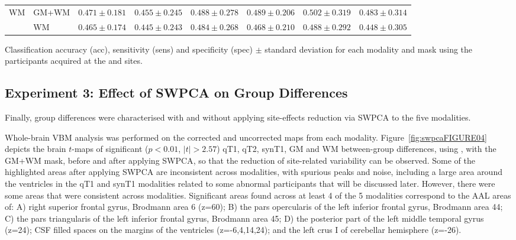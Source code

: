 \begin{bigtable}
\begin{tabularx}{\linewidth}{ll|XXX|XXX}
		\midrule
		\multirow{2}{*}{\ac{WM}} &GM+WM &		$ 0.471 \pm 0.181 $ & $ 0.455 \pm 0.245 $ & $ 0.488 \pm 0.278 $ & $ 0.489 \pm 0.206 $ & $ 0.502 \pm 0.319 $ &  $ 0.483 \pm 0.314 $ \\
		&		WM &		$ 0.465 \pm 0.174 $ & $ 0.445 \pm 0.243 $ & $ 0.484 \pm 0.268 $ & $ 0.468 \pm 0.210 $ & $ 0.488 \pm 0.292 $ &  $ 0.448 \pm 0.305 $ \\
		\bottomrule
	\end{tabularx}
	\caption[Classification accuracy (acc), sensitivity (sens) and specificity (spec) $\pm$ standard deviation for each modality and mask using the participants acquired at the \lon{} and \cam{} sites.]{Classification accuracy (acc), sensitivity (sens) and specificity (spec) $\pm$ standard deviation for each modality and mask using the participants acquired at the \lon{} and \cam{} sites.}
	\label{tab:swpcaLONCAM}
\end{bigtable}



\subsection{Experiment 3: Effect of \acs{SWPCA} on Group Differences}\label{sec:swpcaE3}
Finally, group differences were characterised with and without applying site-effects reduction via \ac{SWPCA} to the five modalities. 

Whole-brain \ac{VBM} analysis was performed on the corrected and uncorrected maps from each modality. Figure~\ref{fig:swpcaFIGURE04} depicts the brain $t$-maps of significant ($p<0.01$, $|t|>2.57$) \ac{qT1}, \ac{qT2}, \ac{synT1}, \ac{GM} and \ac{WM} between-group differences, using \all{}, with the GM+WM mask, before and after applying \ac{SWPCA}, so that the reduction of site-related variability can be observed. Some of the highlighted areas after applying \ac{SWPCA} are inconsistent across modalities, with spurious peaks and noise, including a large area around the ventricles in the \ac{qT1} and \ac{synT1} modalities related to some abnormal participants that will be discussed later. However, there were some areas that were consistent across modalities. Significant areas found across at least 4 of the 5 modalities correspond to the \ac{AAL} \cite{Tzourio-Mazoyer2002} areas of: A) right superior frontal gyrus, Brodmann area 6 (z=60); B) the pars opercularis of the left inferior frontal gyrus, Brodmann area 44; C) the pars triangularis of the left inferior frontal gyrus, Brodmann area 45; D) the posterior part of the left middle temporal gyrus (z=24); \ac{CSF} filled spaces on the margins of the ventricles (z=-6,4,14,24); and the left crus I of cerebellar hemisphere (z=-26).

